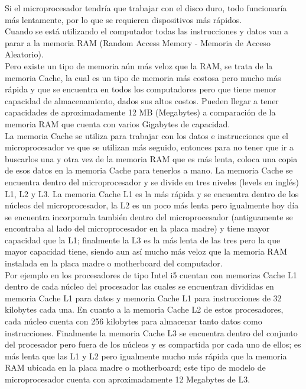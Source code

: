 \documentclass{article}
\begin{document}
Si el microprocesador tendría que trabajar con el disco duro, todo funcionaría más lentamente,
por lo que se requieren dispositivos más rápidos.\\[0.1cm]
Cuando se está utilizando el computador todas las instrucciones y datos van a parar a la
memoria RAM (Random Access Memory - Memoria de Acceso Aleatorio).\\[0.1cm]
Pero existe un tipo de memoria aún más veloz que la RAM, se trata de la memoria Cache, la cual
es un tipo de memoria más costosa pero mucho más rápida y que se encuentra en todos los
computadores pero que tiene menor capacidad de almacenamiento, dados sus altos costos.
Pueden llegar a tener capacidades de aproximadamente 12 MB (Megabytes) a comparación de
la memoria RAM que cuenta con varios Gigabytes de capacidad.\\[0.1cm]
La memoria Cache se utiliza para trabajar con los datos e instrucciones que el microprocesador
ve que se utilizan más seguido, entonces para no tener que ir a buscarlos una y otra vez de la
memoria RAM que es más lenta, coloca una copia de esos datos en la memoria Cache para
tenerlos a mano. La memoria Cache se encuentra dentro del microprocesador y se divide en
tres niveles (levels en inglés) L1, L2 y L3. La memoria Cache L1 es la más rápida y se encuentra
dentro de los núcleos del microprocesador, la L2 es un poco más lenta pero igualmente hoy día
se encuentra incorporada también dentro del microprocesador (antiguamente se encontraba
al lado del microprocesador en la placa madre) y tiene mayor capacidad que la L1; finalmente
la L3 es la más lenta de las tres pero la que mayor capacidad tiene, siendo aun así mucho más
veloz que la memoria RAM instalada en la placa madre o motherboard del computador.\\[0.1cm]
Por ejemplo en los procesadores de tipo Intel i5 cuentan con memorias Cache L1 dentro de cada
núcleo del procesador las cuales se encuentran divididas en memoria Cache L1 para datos
y memoria Cache L1 para instrucciones de 32 kilobytes cada una. En cuanto a la
memoria Cache L2 de estos procesadores, cada núcleo cuenta con 256 kilobytes para almacenar
tanto datos como instrucciones. Finalmente la memoria Cache L3 se encuentra dentro del
conjunto del procesador pero fuera de los núcleos y es compartida por cada uno de ellos; es
más lenta que las L1 y L2 pero igualmente mucho más rápida que la memoria RAM ubicada en
la placa madre o motherboard; este tipo de modelo de microprocesador cuenta con
aproximadamente 12 Megabytes de L3.\\[0.1cm]
\end{document}
